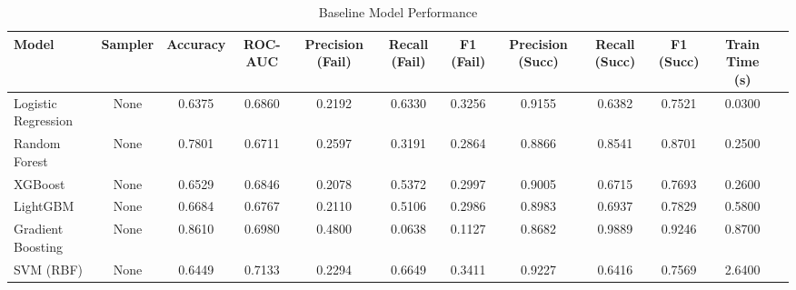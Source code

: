 \begin{table}[htbp]
\caption{Baseline Model Performance}
\label{tab:baseline_results}
\begin{tabular}{lccccccccccc}
\toprule

Model & Sampler & Accuracy & ROC-AUC & Precision (Fail) & Recall (Fail) & F1 (Fail) & Precision (Succ) & Recall (Succ) & F1 (Succ) & Train Time (s) \\
\midrule

Logistic Regression & None & 0.6375 & 0.6860 & 0.2192 & 0.6330 & 0.3256 & 0.9155 & 0.6382 & 0.7521 & 0.0300 \\
Random Forest & None & 0.7801 & 0.6711 & 0.2597 & 0.3191 & 0.2864 & 0.8866 & 0.8541 & 0.8701 & 0.2500 \\
XGBoost & None & 0.6529 & 0.6846 & 0.2078 & 0.5372 & 0.2997 & 0.9005 & 0.6715 & 0.7693 & 0.2600 \\
LightGBM & None & 0.6684 & 0.6767 & 0.2110 & 0.5106 & 0.2986 & 0.8983 & 0.6937 & 0.7829 & 0.5800 \\
Gradient Boosting & None & 0.8610 & 0.6980 & 0.4800 & 0.0638 & 0.1127 & 0.8682 & 0.9889 & 0.9246 & 0.8700 \\
SVM (RBF) & None & 0.6449 & 0.7133 & 0.2294 & 0.6649 & 0.3411 & 0.9227 & 0.6416 & 0.7569 & 2.6400 \\
\bottomrule

\end{tabular}
\end{table}
